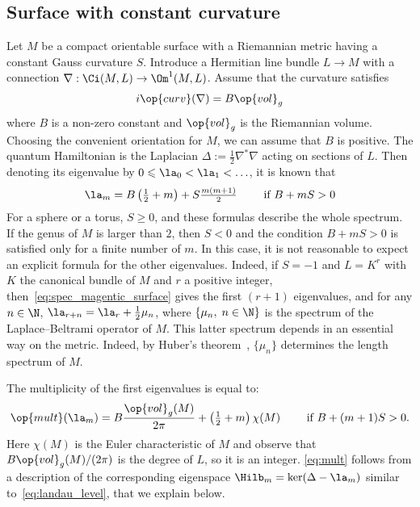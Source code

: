 \subsection*{Surface with constant curvature~\cite{IeLi94, Te06}}
Let $M$ be a compact orientable surface with a Riemannian metric having a constant Gauss curvature $S$. Introduce a Hermitian line bundle $ L
\rightarrow M$ with a connection $\nabla : \Ci (M, L) \rightarrow \Om^1 (M,L)$. Assume that the curvature satisfies
\begin{gather}\label{eq:constant_magnetic}
i \op{curv} (\nabla) = B
\op{vol}_g
\end{gather}
where $B$ is a non-zero constant and $\op{vol}_g$ is the Riemannian volume. Choosing the convenient orientation for $M$, we can assume that $B$ is positive. The quantum Hamiltonian is the Laplacian $ \Delta := \frac{1}{2} \nabla^* \nabla $ acting on sections of $L$. Then denoting its eigenvalue by $0 \leqslant \la_0 < \la_1 <
\ldots $, it is known that
\begin{gather}\label{eq:spec_magentic_surface}
\la_m = B \left(\tfrac{1}{2} + m\right) + S \tfrac{ m (m+1)}{2} \qquad \text{ if } B + m S >0
\end{gather}
For a sphere or a torus, $S \geqslant 0$, and these formulas describe the whole spectrum. If the genus of $M$ is larger than $2$, then $S<0$ and the condition $B + m S >0$ is satisfied only for a finite number of $m$. In this case, it is not reasonable to expect an explicit formula for the other eigenvalues. Indeed, if $S=-1$ and $L = K^r$ with $K$ the canonical bundle of $M$ and $r$ a positive integer, then~\eqref{eq:spec_magentic_surface} gives the first $(r+1)$ eigenvalues, and for any $n \in \N$, $\la_{r+n} = \la_r + \tfrac{1}{2} \mu_n$, where $\{\mu_n, \; n
\in \N\}$ is the spectrum of the Laplace--Beltrami operator of $M$. This latter spectrum depends in an essential way on the metric. Indeed, by Huber's theorem~\cite[Theorem~9.2.9]{Buser}, $\{ \mu_n\}$ determines the length spectrum of $M$.

The multiplicity of the first eigenvalues is equal to:
\begin{gather}\label{eq:mult}
\op{mult} (\la_m) = B \frac{ \op{vol}_g (M)}{2\pi} + \left(\tfrac{1}{2} + m\right)
\chi (M) \qquad \text{ if } B + (m+1)S >0.
\end{gather}
Here $\chi (M)$ is the Euler characteristic of $M$ and observe that $B
\op{vol}_g (M) / (2\pi)$ is the degree of $L$, so it is an integer. \eqref{eq:mult} follows from a description of the corresponding eigenspace $\Hilb_m = \ker (\Delta -
\la_m)$ similar to~\eqref{eq:landau_level}, that we explain below.

